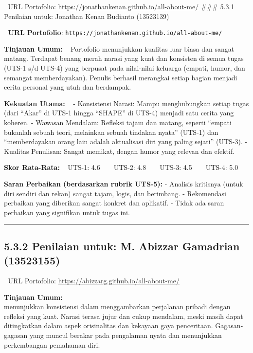 \documentclass[
  letterpaper,
  DIV=11,
  numbers=noendperiod]{scrreprt}
\begin{document}
🔗 URL Portofolio: \url{https://jonathankenan.github.io/all-about-me/}
\#\#\# 5.3.1 Penilaian untuk: Jonathan Kenan Budianto (13523139)

🔗 \textbf{URL Portofolio}:
\texttt{https://jonathankenan.github.io/all-about-me/}

\textbf{Tinjauan Umum:} ~ Portofolio menunjukkan kualitas luar biasa dan
sangat matang. Terdapat benang merah narasi yang kuat dan konsisten di
semua tugas (UTS-1 s/d UTS-4) yang berpusat pada nilai-nilai keluarga
(empati, humor, dan semangat memberdayakan). Penulis berhasil merangkai
setiap bagian menjadi cerita personal yang utuh dan berdampak.

\textbf{Kekuatan Utama:} ~ - Konsistensi Narasi: Mampu menghubungkan
setiap tugas (dari ``Akar'' di UTS-1 hingga ``SHAPE'' di UTS-4) menjadi
satu cerita yang koheren. - Wawasan Mendalam: Refleksi tajam dan matang,
seperti ``empati bukanlah sebuah teori, melainkan sebuah tindakan
nyata'' (UTS-1) dan ``memberdayakan orang lain adalah aktualisasi diri
yang paling sejati'' (UTS-3). - Kualitas Penulisan: Sangat memikat,
dengan humor yang relevan dan efektif.

\textbf{Skor Rata-Rata:} ~ UTS-1: 4.6 \textbar{} UTS-2:
4.8 \textbar{} UTS-3: 4.5 \textbar{} UTS-4: 5.0

\textbf{Saran Perbaikan (berdasarkan rubrik UTS-5):} - Analisis
kritisnya (untuk diri sendiri dan rekan) sangat tajam, logis, dan
berimbang. - Rekomendasi perbaikan yang diberikan sangat konkret dan
aplikatif. - Tidak ada saran perbaikan yang signifikan untuk tugas ini.

\begin{center}\rule{0.5\linewidth}{0.5pt}\end{center}

\subsection{5.3.2 Penilaian untuk: M. Abizzar Gamadrian
(13523155)}\label{penilaian-untuk-m.-abizzar-gamadrian-13523155}

🔗 URL Portofolio: \url{https://abizzarg.github.io/all-about-me/}

\textbf{Tinjauan Umum:}\\
menunjukkan konsistensi dalam menggambarkan perjalanan pribadi dengan
refleksi yang kuat. Narasi terasa jujur dan cukup mendalam, meski masih
dapat ditingkatkan dalam aspek orisinalitas dan kekayaan gaya
penceritaan. Gagasan-gagasan yang muncul berakar pada pengalaman nyata
dan menunjukkan perkembangan pemahaman diri.
\end{document}
